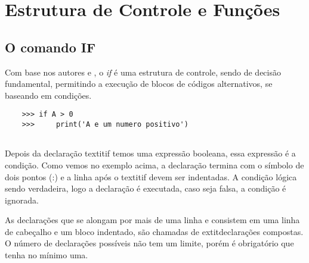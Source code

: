     \section{Estrutura de Controle e Funções}
	
            \subsection{O comando IF}
			Com base nos autores \cite{Perkovic2016} e \cite{Severance2016}, o \textit{if} é uma estrutura de controle, sendo de decisão fundamental, permitindo a execução de blocos de códigos alternativos, se baseando em condições.
			\begin{lstlisting}
	>>> if A > 0
	>>> 	print('A e um numero positivo')
	
			\end{lstlisting}
			 Depois da declaração textit{if} temos uma expressão booleana, essa expressão é a condição. Como vemos no exemplo acima, a declaração termina com o símbolo de dois pontos (:) e a linha após o textit{if} devem ser indentadas. A condição lógica sendo verdadeira, logo a declaração é executada, caso seja falsa, a condição é ignorada.
			 
			 As declarações que se alongam por mais de uma linha e consistem em uma linha de cabeçalho e um bloco indentado, são chamadas de extit{declarações compostas}. O número de declarações possíveis não tem um limite, porém é obrigatório que tenha no mínimo uma. 
			 
